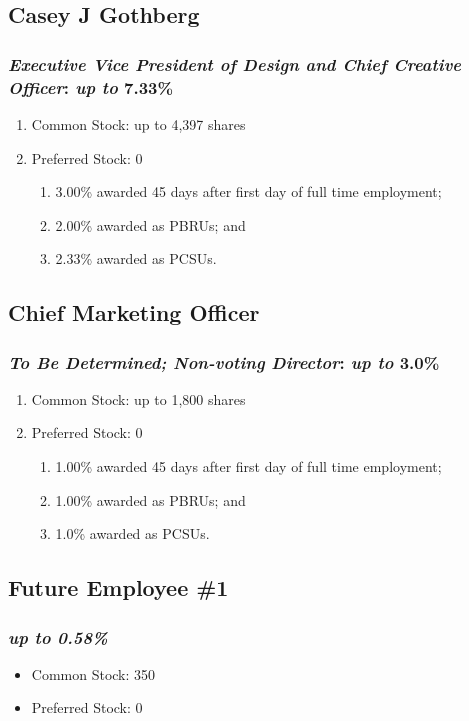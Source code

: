 \documentclass[11pt]{report}
\begin{document}
\subsection{Casey J Gothberg}
	\subsubsection{\textit{Executive Vice President of Design and Chief Creative Officer}: \emph{up to} \textbf{7.33\%}}
	\begin{enumerate}
		\item Common Stock: up to 4,397 shares
		\item Preferred Stock: 0
		\begin{enumerate}
			\item 3.00\% awarded 45 days after first day of full time employment;
			\item 2.00\% awarded as PBRUs; and
			\item 2.33\% awarded as PCSUs.
		\end{enumerate}
	\end{enumerate}

\subsection{Chief Marketing Officer}
	\subsubsection{\textit{To Be Determined; Non-voting Director}: \emph{up to} 3.0\%}
	\begin{enumerate}
		\item Common Stock: up to 1,800 shares
		\item Preferred Stock: 0
		\begin{enumerate}
			\item 1.00\% awarded 45 days after first day of full time employment;
			\item 1.00\% awarded as PBRUs; and
			\item 1.0\% awarded as PCSUs.
		\end{enumerate}
	\end{enumerate}

\subsection{Future Employee \#1}
	\subsubsection{\emph{up to 0.58\%}}
		\begin{itemize}
			\item Common Stock: 350
			\item Preferred Stock: 0
		\end{itemize}
\end{document}
